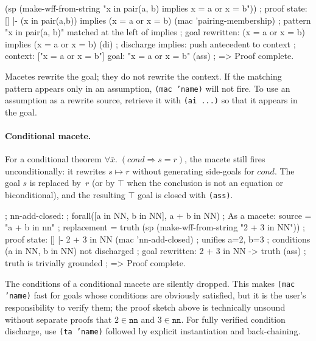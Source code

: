 \begin{VNBcode}
(sp (make-wff-from-string "x in pair(a, b) implies x = a or x = b"))
; proof state:  []  |-  (x in pair(a,b)) implies (x = a or x = b)
(mac 'pairing-membership)
; pattern "x in pair(a, b)" matched at the left of implies
; goal rewritten:  (x = a or x = b) implies (x = a or x = b)
(di)        ; discharge implies: push antecedent to context
; context: ["x = a or x = b"]   goal: "x = a or x = b"
(ass)
; => Proof complete.
\end{VNBcode}

\begin{remark}
Macetes rewrite the goal; they do not rewrite the context.  If the
matching pattern appears only in an assumption, \texttt{(mac 'name)}
will not fire.  To use an assumption as a rewrite source, retrieve it
with \texttt{(ai ...)} so that it appears in the goal.
\end{remark}

\paragraph{Conditional macete.}
For a conditional theorem
$\forall\bar{x}.\;(\mathit{cond} \Rightarrow s = r)$, the macete still
fires unconditionally: it rewrites $s \mapsto r$ without generating
side-goals for $\mathit{cond}$.  The goal $s$ is replaced by~$r$
(or by $\top$ when the conclusion is not an equation or biconditional),
and the resulting $\top$ goal is closed with \texttt{(ass)}.

\begin{VNBcode}
; nn-add-closed:
;   forall([a in NN, b in NN], a + b in NN)
; As a macete: source = "a + b in nn"
;              replacement = truth
(sp (make-wff-from-string "2 + 3 in NN"))
; proof state:  []  |-  2 + 3 in NN
(mac 'nn-add-closed)
; unifies a=2, b=3
; conditions (a in NN, b in NN) not discharged
; goal rewritten:  2 + 3 in NN  ->  truth
(ass)       ; truth is trivially grounded
; => Proof complete.
\end{VNBcode}

\begin{remark}
The conditions of a conditional macete are silently dropped.  This
makes \texttt{(mac 'name)} fast for goals whose conditions are obviously
satisfied, but it is the user's responsibility to verify them; the
proof sketch above is technically unsound without separate proofs that
$2 \in \mathtt{nn}$ and $3 \in \mathtt{nn}$.  For fully verified
condition discharge, use \texttt{(ta 'name)} followed by explicit
instantiation and back-chaining.
\end{remark}

